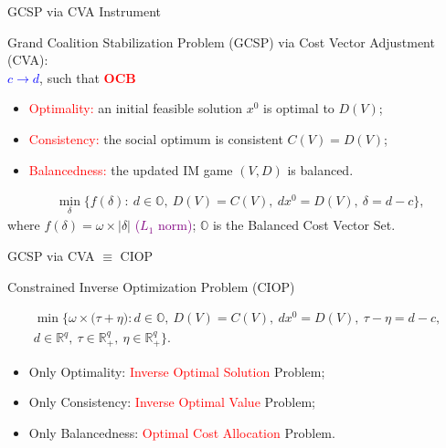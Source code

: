 \documentclass[14pt]{beamer}
\newcommand{\R}{\mathbb{R}}
\begin{document}
\begin{frame}{GCSP via CVA Instrument}
\begin{definition}\label{definition:inverse}
\small
\justifying
Grand Coalition Stabilization Problem (GCSP) via Cost Vector Adjustment (CVA):\\
\centering \textcolor{blue}{\bf $c \rightarrow d$}, such that \textcolor{red}{\bf OCB}
\begin{itemize}
\pause
\item \textcolor{red}{Optimality:} an initial feasible solution $x^0$ is optimal to $D(V)$;
\pause
\item \textcolor{red}{Consistency:} the social optimum is consistent $C(V)=D(V)$;
\pause
\item \textcolor{red}{Balancedness:} the updated IM game $(V,D)$ is balanced.
\end{itemize}
\pause
\vspace{-3mm}
\begin{eqnarray*}\label{eqn:inverse}
~~\min_{\delta} \bigg\{f(\delta):~ d \in \mathbb{O}, ~D(V) = C(V), ~dx^0 = D(V),~\delta = d-c\bigg\},
\end{eqnarray*}
where $f(\delta) = \omega \times |\delta|$ \textcolor{purple}{($L_1$ norm)}; $\mathbb{O}$ is the Balanced Cost Vector Set.
\end{definition}
\end{frame}

\begin{frame}{GCSP via CVA $\equiv$ CIOP}
\vspace{-3mm}
\begin{shaded}
\centering
Constrained Inverse Optimization Problem (CIOP)
\end{shaded}
\vspace{-5mm}
\footnotesize
\begin{eqnarray*}
\min \bigg\{ \omega \times \big( \tau + \eta \big): d \in \mathbb{O}, ~D(V) = C(V), ~dx^0 = D(V),~\tau -\eta = d-c,\\
d \in \R^{q},~\tau \in \R^{q}_+, ~\eta \in \R^{q}_+\bigg\}.
\end{eqnarray*}
\begin{itemize}
\small
\item Only Optimality: \textcolor{red}{Inverse Optimal Solution} Problem;
\item Only Consistency: \textcolor{red}{Inverse Optimal Value} Problem;
\item Only Balancedness: \textcolor{red}{Optimal Cost Allocation} Problem.
\end{itemize}
\end{frame}
\end{document}
